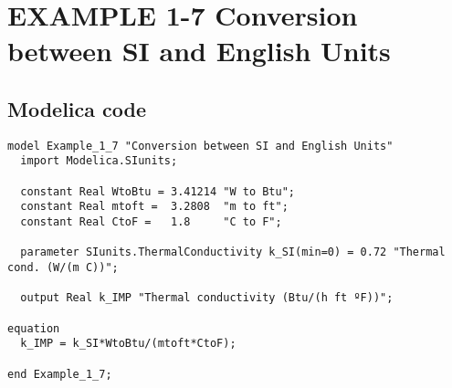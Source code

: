 \documentclass{modelica}
\begin{document}
\thispagestyle{empty}
\date{} %

\section*{EXAMPLE 1-7 Conversion between SI and English Units}

\subsection*{Modelica code}


\begin{lstlisting}[mathescape=true] 
model Example_1_7 "Conversion between SI and English Units"
  import Modelica.SIunits;

  constant Real WtoBtu = 3.41214 "W to Btu";
  constant Real mtoft =  3.2808  "m to ft";
  constant Real CtoF =   1.8     "C to F";

  parameter SIunits.ThermalConductivity k_SI(min=0) = 0.72 "Thermal cond. (W/(m C))";
  
  output Real k_IMP "Thermal conductivity (Btu/(h ft ºF))";

equation 
  k_IMP = k_SI*WtoBtu/(mtoft*CtoF);
  
end Example_1_7;  
\end{lstlisting}
\end{document}
